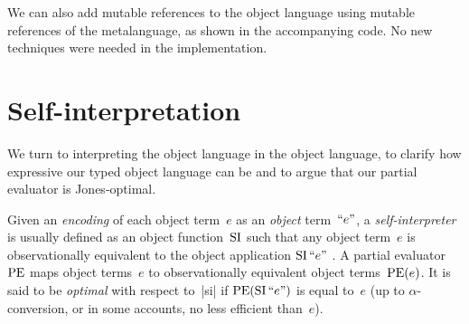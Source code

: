 We can also add mutable references to the object language using
mutable references of the metalanguage, as shown in the accompanying
code.  No new techniques were needed in the implementation.

\fi
\fi

\ifshort\else
\section{Self-interpretation}\label{selfinterp}

We turn to interpreting the object language in the object language, to
clarify how expressive our typed object language can be and to argue that our
partial evaluator is Jones\hyp optimal.

Given an \emph{encoding} of each object term~$e$ as an \emph{object} term~$\mathinner{\mathopen{\text{``}}e\mathclose{\text{''}}}$,
a \emph{self\hyp interpreter} is usually defined as an object
function~$\operatorname{SI}$ such that any object term~$e$ is observationally
equivalent to the object application $\operatorname{SI}\mathinner{\mathopen{\text{``}}e\mathclose{\text{''}}}$
\cite{jones-partial,taha-tag,Danvy-tagging-encoding}.
A partial evaluator~$\operatorname{PE}$ maps object terms~$e$ to observationally
equivalent object terms~$\operatorname{PE}(e)$.  It is said to be
\emph{optimal} with respect to~|si| if $\operatorname{PE}(\operatorname{SI}\mathinner{\mathopen{\text{``}}e\mathclose{\text{''}}})$
is equal to~$e$ (up to $\alpha$\hyp conversion, or in some accounts, no
less efficient than~$e$).

